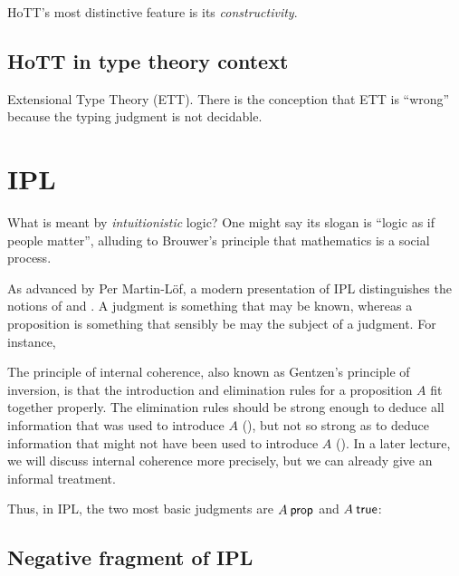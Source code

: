 \documentclass[12pt]{article}
\begin{document}
\Acs{HoTT}'s most distinctive feature is its \emph{constructivity}.

\subsection{\Acs{HoTT} in type theory context}\label{subsec:type_theory_context}

Extensional Type Theory (ETT).  There is the conception that ETT is ``wrong''~\cite{Harper2012}
because the typing judgment is not decidable.

\section{\Acl{IPL}}\label{sec:ipl}


What is meant by \emph{intuitionistic} logic?  One might say its slogan is ``logic as if people matter'', alluding to Brouwer's principle that mathematics is a social process.

As advanced by Per Martin-L\"{o}f, a modern presentation of \acf{IPL} distinguishes the notions of  and .
A judgment is something that may be known, whereas a proposition is something that sensibly be may the subject of a judgment.
For instance, 


The principle of internal coherence, also known as Gentzen's principle of inversion, is that the introduction and elimination rules for a proposition $A$ fit together properly.  The elimination rules should be strong enough to deduce all information that was used to introduce $A$ (), but not so strong as to deduce information that might not have been used to introduce $A$ ().  In a later lecture, we will discuss internal coherence more precisely, but we can already give an informal treatment.


Thus, in \ac{IPL}, the two most basic judgments are $A \prop$ and $A \true$:


\subsection{Negative fragment of \ac{IPL}}\label{sec:ipl-negative}
\end{document}
